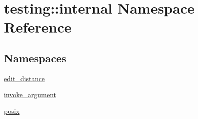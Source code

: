 \hypertarget{namespacetesting_1_1internal}{}\section{testing\+::internal Namespace Reference}
\label{namespacetesting_1_1internal}
\subsection*{Namespaces}
\begin{DoxyCompactItemize}
\item 
 \mbox{\hyperlink{namespacetesting_1_1internal_1_1edit__distance}{edit\+\_\+distance}}
\item 
 \mbox{\hyperlink{namespacetesting_1_1internal_1_1invoke__argument}{invoke\+\_\+argument}}
\item 
 \mbox{\hyperlink{namespacetesting_1_1internal_1_1posix}{posix}}
\end{DoxyCompactItemize}
